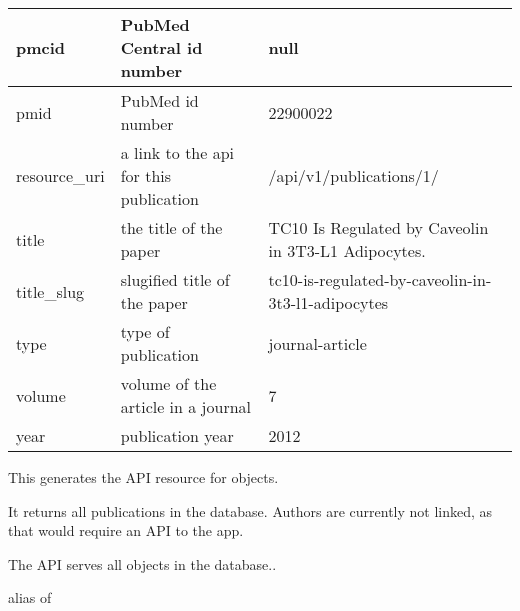 \documentclass[letterpaper,10pt,english]{sphinxmanual}
\begin{document}
\begin{tabulary}{\linewidth}{|L|L|L|}
pmcid
 & 
PubMed Central id number
 & 
null
\\\hline

pmid
 & 
PubMed id number
 & 
22900022
\\\hline

resource\_uri
 & 
a link to the api for this publication
 & 
/api/v1/publications/1/
\\\hline

title
 & 
the title of the paper
 & 
TC10 Is Regulated by Caveolin in 3T3-L1 Adipocytes.
\\\hline

title\_slug
 & 
slugified title of the paper
 & 
tc10-is-regulated-by-caveolin-in-3t3-l1-adipocytes
\\\hline

type
 & 
type of publication
 & 
journal-article
\\\hline

volume
 & 
volume of the article in a journal
 & 
7
\\\hline

year
 & 
publication year
 & 
2012
\\\hline
\end{tabulary}


\begin{fulllineitems}
\label{papers:papers.api.PublicationResource}
This generates the API resource for {\hyperref[papers:papers.models.Publication]{}} objects.

It returns all publications in the database.
Authors are currently not linked, as that would require an API to the  app.

\begin{fulllineitems}
\label{papers:papers.api.PublicationResource.Meta}
The API serves all {\hyperref[papers:papers.models.Publication]{}} objects in the database..

\begin{fulllineitems}
\label{papers:papers.api.PublicationResource.Meta.object_class}
alias of 

\end{fulllineitems}


\end{fulllineitems}


\end{fulllineitems}
\end{document}
